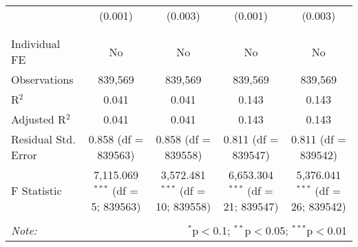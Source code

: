 \documentclass[
]{article}
\begin{document}
\begin{table}[!htbp]
{\begin{tabular}{@{\extracolsep{5pt}}lcccc}
  & (0.001) & (0.003) & (0.001) & (0.003) \\ 
  & & & & \\ 
\hline \\[-1.8ex] 
Individual FE & No & No & No & No \\ 
Observations & 839,569 & 839,569 & 839,569 & 839,569 \\ 
R$^{2}$ & 0.041 & 0.041 & 0.143 & 0.143 \\ 
Adjusted R$^{2}$ & 0.041 & 0.041 & 0.143 & 0.143 \\ 
Residual Std. Error & 0.858 (df = 839563) & 0.858 (df = 839558) & 0.811 (df = 839547) & 0.811 (df = 839542) \\ 
F Statistic & 7,115.069$^{***}$ (df = 5; 839563) & 3,572.481$^{***}$ (df = 10; 839558) & 6,653.304$^{***}$ (df = 21; 839547) & 5,376.041$^{***}$ (df = 26; 839542) \\ 
\hline 
\hline \\[-1.8ex] 
\textit{Note:}  & \multicolumn{4}{r}{$^{*}$p$<$0.1; $^{**}$p$<$0.05; $^{***}$p$<$0.01} \\ 
\end{tabular}
} 
\end{table} 
\newpage
\end{document}
